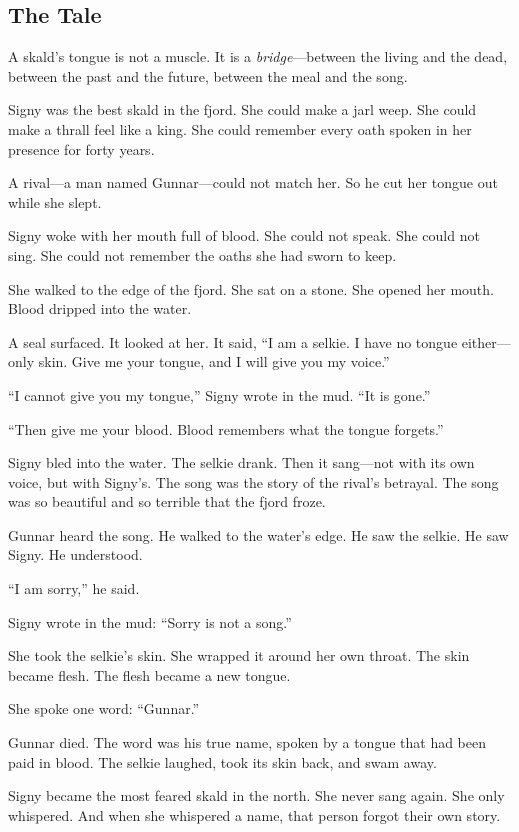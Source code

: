 \documentclass[9pt,a5paper]{extbook}
\begin{document}
\subsection*{The Tale}

A skald's tongue is not a muscle. It is a \textit{bridge}---between the living and the dead, between the past and the future, between the meal and the song.

Signy was the best skald in the fjord. She could make a jarl weep. She could make a thrall feel like a king. She could remember every oath spoken in her presence for forty years.

A rival---a man named Gunnar---could not match her. So he cut her tongue out while she slept.

Signy woke with her mouth full of blood. She could not speak. She could not sing. She could not remember the oaths she had sworn to keep.

She walked to the edge of the fjord. She sat on a stone. She opened her mouth. Blood dripped into the water.

A seal surfaced. It looked at her. It said, ``I am a selkie. I have no tongue either---only skin. Give me your tongue, and I will give you my voice.''

``I cannot give you my tongue,'' Signy wrote in the mud. ``It is gone.''

``Then give me your blood. Blood remembers what the tongue forgets.''

Signy bled into the water. The selkie drank. Then it sang---not with its own voice, but with Signy's. The song was the story of the rival's betrayal. The song was so beautiful and so terrible that the fjord froze.

Gunnar heard the song. He walked to the water's edge. He saw the selkie. He saw Signy. He understood.

``I am sorry,'' he said.

Signy wrote in the mud: ``Sorry is not a song.''

She took the selkie's skin. She wrapped it around her own throat. The skin became flesh. The flesh became a new tongue.

She spoke one word: ``Gunnar.''

Gunnar died. The word was his true name, spoken by a tongue that had been paid in blood. The selkie laughed, took its skin back, and swam away.

Signy became the most feared skald in the north. She never sang again. She only whispered. And when she whispered a name, that person forgot their own story.
\end{document}

